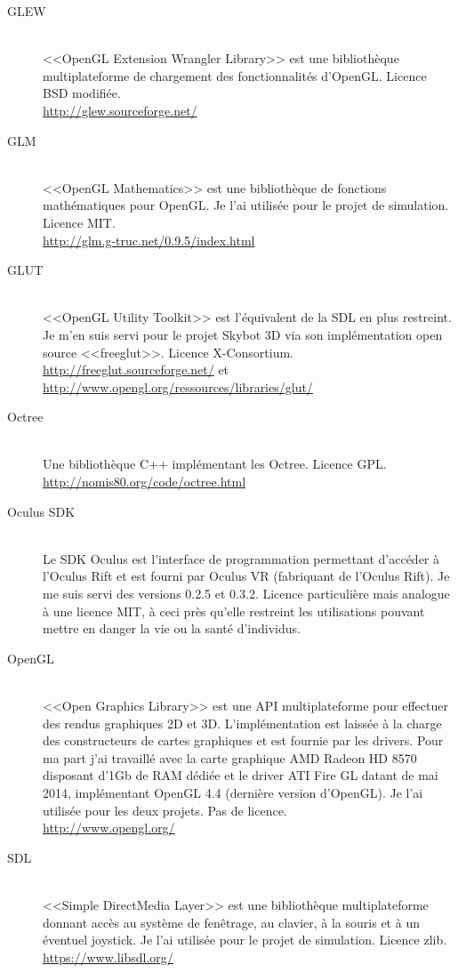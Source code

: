 \documentclass[a4paper,french,12pt]{article}
\begin{document}
		  \begin{description}
		  \item [GLEW]~\\
		      <<OpenGL Extension Wrangler Library>> est une bibliothèque multiplateforme de chargement des fonctionnalités d'OpenGL.
		      Licence BSD modifiée.\\
		      \url{http://glew.sourceforge.net/}
		  \item [GLM]~\\
		      <<OpenGL Mathematics>> est une bibliothèque de fonctions mathématiques pour OpenGL.
		      Je l'ai utilisée pour le projet de simulation.
		      Licence MIT.\\
		      \url{http://glm.g-truc.net/0.9.5/index.html}
		  \item [GLUT]~\\
		      <<OpenGL Utility Toolkit>> est l'équivalent de la SDL en plus restreint. Je m'en suis servi pour le
		      projet Skybot 3D via son implémentation open source <<freeglut>>.
		      Licence X-Consortium.\\
		      \url{http://freeglut.sourceforge.net/} et \url{http://www.opengl.org/ressources/libraries/glut/}
		  \item [Octree]~\\
		      Une bibliothèque C++ implémentant les Octree.
		      Licence GPL.\\
		      \url{http://nomis80.org/code/octree.html}
		  \item [Oculus SDK]~\\
		      Le SDK Oculus est l'interface de programmation permettant d'accéder à l'Oculus Rift et est fourni
		      par Oculus VR (fabriquant de l'Oculus Rift).
		      Je me suis servi des versions 0.2.5 et 0.3.2.
		      Licence particulière mais analogue à une licence MIT, à ceci près qu'elle restreint les utilisations
		      pouvant mettre en danger la vie ou la santé d'individus.
		  \item [OpenGL] ~\\
		      <<Open Graphics Library>> est une API multiplateforme pour effectuer des rendus graphiques 2D et 3D.
		      L'implémentation est laissée à la charge des constructeurs de cartes graphiques et est fournie
		      par les drivers. Pour ma part j'ai travaillé avec la carte graphique AMD Radeon HD 8570 disposant d'1Gb de RAM dédiée
		      et le driver ATI Fire GL datant de mai 2014, implémentant OpenGL 4.4 (dernière version d'OpenGL).
		      Je l'ai utilisée pour les deux projets.
		      Pas de licence.\\
		      \url{http://www.opengl.org/}
		  \item [SDL]~\\
		      <<Simple DirectMedia Layer>> est une bibliothèque multiplateforme donnant accès au système de fenêtrage,
		      au clavier, à la souris et à un éventuel joystick. Je l'ai utilisée pour le projet de simulation.
		      Licence zlib.\\
		      \url{https://www.libsdl.org/}
		  \end{description}
\end{document}
